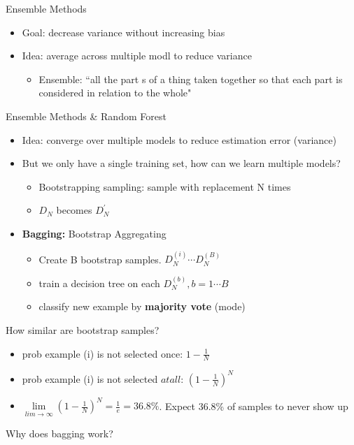 \documentclass[10pt, oneside]{article}
\begin{document}
Ensemble Methods
\begin{itemize}
    \item Goal: decrease variance without increasing bias
    \item Idea: average across multiple modl to reduce variance
    \begin{itemize}
        \item Ensemble: ``all the part s of a thing taken together so that each part is considered in relation to the whole"
    \end{itemize}
\end{itemize}
Ensemble Methods \& Random Forest
\begin{itemize}
    \item Idea: converge over multiple models to reduce estimation error (variance)
    \item But we only have a single training set, how can we learn multiple models?
    \begin{itemize}
        \item Bootstrapping sampling: sample with replacement N times
        \item $D_N$ becomes $D_N^\prime$
    \end{itemize}
    \item \textbf{Bagging:} Bootstrap Aggregating
    \begin{itemize}
        \item Create B bootstrap samples. $D_N^{(i)} \cdots D_N^{(B)}$
        \item train a decision tree on each $D_N^{(b)}, b=1\cdots B$
        \item classify new example by \textbf{majority vote} (mode)
    \end{itemize}
\end{itemize}
How similar are bootstrap samples?
\begin{itemize}
    \item prob example (i) is not selected once: $1-\frac{1}{N}$
    \item prob example (i) is not selected $at all$: $(1-\frac{1}{N})^N$
    \item $\underset{lim\rightarrow \infty}{\lim} (1-\frac{1}{N})^N = \frac{1}{e}= 36.8\%$. Expect 36.8\% of samples to never show up
\end{itemize}
Why does bagging work?
\end{document}
